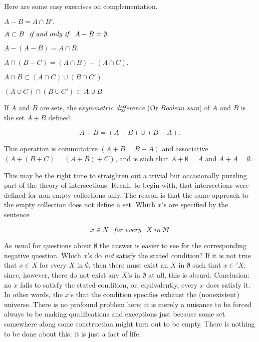 Here are some easy exercises on complementation. 

\begin{center}
$A - B = A \cap B'.$

$A \subset B \text{ \textit{ if and only if } } A - B = \emptyset .$

$A - (A - B) = A \cap B.$

$A \cap (B - C) = (A \cap B) - (A \cap C).$

$A \cap B  \subset (A \cap C) \cup (B \cap C').$

$(A \cup C) \cap (B \cup C') \subset A \cup B$
\end{center}

If $A$ and $B$ are sets, the s\textit{symmetric difference} (Or \textit{Boolean sum}) of $A$ and $B$ is the set $A + B$ defined 

\begin{equation*}
A + B = (A - B) \cup (B - A). 
\end{equation*}

This operation is commutative $(A + B = B + A)$ and associative $(A + (B + C) =  (A + B) + C)$, and is such that $A + \emptyset = A$ and $A + A = \emptyset$.

This may be the right time to straighten out a trivial but occasionally puzzling part of the theory of intersections. Recall, to begin with, that intersections were defined for non-empty collections only. The reason is that the same approach to the empty collection does not define a set. Which $x'$s are specified by the sentence 

\begin{equation*}
x \in X \text{ \textit{ for every } } X \: in \: \emptyset ? 
\end{equation*}


As usual for questions about $ \emptyset $ the answer is easier to see for the corresponding negative question. Which $x$'s do \textit{not} satisfy the stated condition? If it is not true that $x \in X$ for every $X$ in $\emptyset$, then there must exist an $X$ in $\emptyset$ such that $x \in ' X$; since, however, there do not exist any $X$'s in $ \emptyset $ at all, this is absurd. Conclusion: no $x$ fails to satisfy the stated condition, or, equivalently, every $x$ does satisfy it. In other words, the $x$'s that the condition specifies exhaust the (nonexistent) universe. There is no profound problem here; it is merely a nuisance to be forced always to be making qualifications and exceptions just because some set somewhere along some construction might turn out to be empty. There is nothing to be done about this; it is just a fact of life. 

